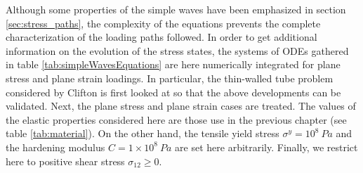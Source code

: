 Although some properties of the simple waves have been emphasized in section \ref{sec:stress_paths}, the complexity of the equations prevents the complete characterization of the loading paths followed.
In order to get additional information on the evolution of the stress states, the systems of ODEs gathered in table \ref{tab:simpleWavesEquations} are here numerically integrated for plane stress and plane strain loadings. %
In particular, the thin-walled tube problem considered by Clifton \cite{Clifton} is first looked at so that the above developments can be validated.
Next, the plane stress and plane strain cases are treated.
The values of the elastic properties considered here are those use in the previous chapter (see table \ref{tab:material}).
On the other hand, the tensile yield stress $\sigma^y=10^{8} \: Pa$ and the hardening modulus $C=1\times10^8 \: Pa$ are set here arbitrarily.
Finally, we restrict here to positive shear stress $\sigma_{12}\geq 0$.
